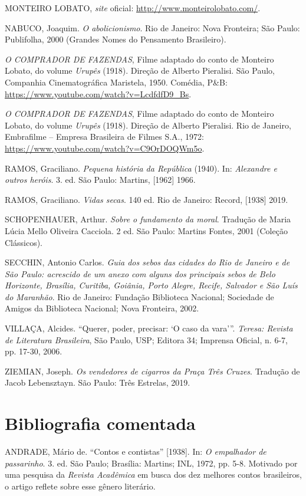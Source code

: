 \documentclass[12pt]{extarticle}
\begin{document}
MONTEIRO LOBATO, \emph{site} oficial:
\url{http://www.monteirolobato.com/}.

NABUCO, Joaquim. \emph{O abolicionismo}. Rio de Janeiro: Nova Fronteira;
São Paulo: Publifolha, 2000 (Grandes Nomes do Pensamento Brasileiro).

\emph{O COMPRADOR DE FAZENDAS}, Filme adaptado do conto de Monteiro
Lobato, do volume \emph{Urupês} (1918). Direção de Alberto Pieralisi.
São Paulo, Companhia Cinematográfica Maristela, 1950. Comédia, P\&B:
\url{https://www.youtube.com/watch?v=LcdfdfD9_Bs}.

\emph{O COMPRADOR DE FAZENDAS}, Filme adaptado do conto de Monteiro
Lobato, do volume \emph{Urupês} (1918). Direção de Alberto Pieralisi.
Rio de Janeiro, Embrafilme -- Empresa Brasileira de Filmes S.A., 1972:
\url{https://www.youtube.com/watch?v=C9OrDOQWm5o}.

RAMOS, Graciliano. \emph{Pequena história da República} (1940). In:
\emph{Alexandre e outros heróis}. 3. ed. São Paulo: Martins, {[}1962{]}
1966.

RAMOS, Graciliano. \emph{Vidas secas}. 140 ed. Rio de Janeiro: Record,
{[}1938{]} 2019.

SCHOPENHAUER, Arthur. \emph{Sobre o fundamento da moral}. Tradução de
Maria Lúcia Mello Oliveira Cacciola. 2 ed. São Paulo: Martins Fontes,
2001 (Coleção Clássicos).

SECCHIN, Antonio Carlos. \emph{Guia dos sebos das cidades do Rio de
Janeiro e de São Paulo: acrescido de um anexo com alguns dos principais
sebos de Belo Horizonte, Brasília, Curitiba, Goiânia, Porto Alegre,
Recife, Salvador e São Luís do Maranhão}. Rio de Janeiro: Fundação
Biblioteca Nacional; Sociedade de Amigos da Biblioteca Nacional; Nova
Fronteira, 2002.

VILLAÇA, Alcides. ``Querer, poder, precisar: `O caso da vara'''.
\emph{Teresa: Revista de Literatura Brasileira}, São Paulo, USP; Editora
34; Imprensa Oficial, n. 6-7, pp. 17-30, 2006.

ZIEMIAN, Joseph. \emph{Os vendedores de cigarros da Praça Três Cruzes}.
Tradução de Jacob Lebensztayn. São Paulo: Três Estrelas, 2019.

\section{Bibliografia comentada}

ANDRADE, Mário de. ``Contos e contistas'' {[}1938{]}. In: \emph{O
empalhador de passarinho}. 3. ed. São Paulo; Brasília: Martins; INL,
1972, pp. 5-8. Motivado por uma pesquisa da \emph{Revista Acadêmica} em
busca dos dez melhores contos brasileiros, o artigo reflete sobre esse
gênero literário.
\end{document}
